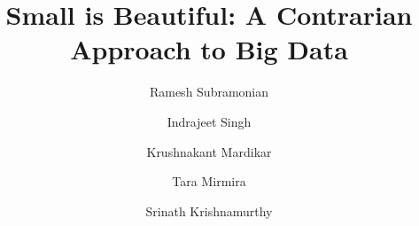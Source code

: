 \documentclass[10pt,sigconf]{acmart}
\begin{document}
\title{Small is Beautiful: A Contrarian Approach to Big Data}


\author{Ramesh Subramonian}

\author{Indrajeet Singh}

\author{Krushnakant Mardikar}

\author{Tara Mirmira}

\author{Srinath Krishnamurthy}

  \renewcommand{\shortauthors}{R. Subramonian et al}




%
%


\maketitle



% 
\newpage

 
\end{document}
